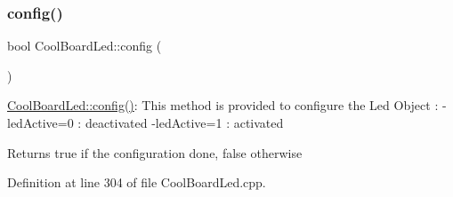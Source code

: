 \subsubsection{\texorpdfstring{config()}{config()}}
{\footnotesize\ttfamily bool Cool\+Board\+Led\+::config (\begin{DoxyParamCaption}{ }\end{DoxyParamCaption})}

\hyperlink{class_cool_board_led_a1b60e5e30bea96c49ed62ed1bf1ffc8b}{Cool\+Board\+Led\+::config()}\+: This method is provided to configure the Led Object \+: -\/led\+Active=0 \+: deactivated -\/led\+Active=1 \+: activated \begin{DoxyReturn}{Returns}
true if the configuration done, false otherwise 
\end{DoxyReturn}


Definition at line 304 of file Cool\+Board\+Led.\+cpp.


